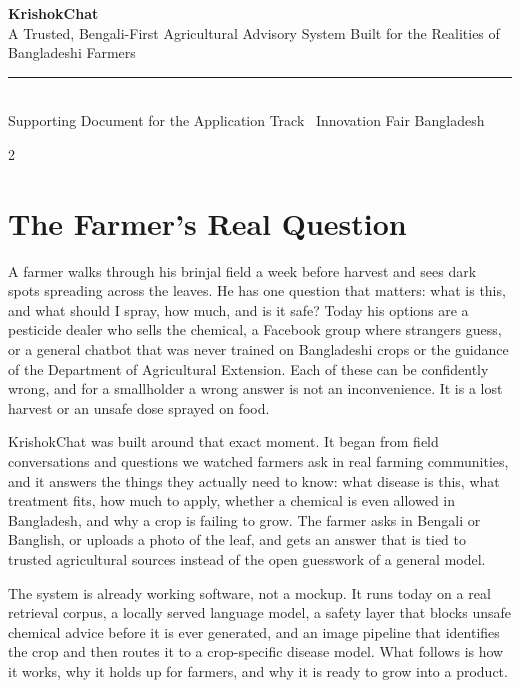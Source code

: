 \documentclass[11pt]{article}
\begin{document}
\begin{center}
{\LARGE\bfseries\color{brandgreen} KrishokChat}\\[3pt]
{\large A Trusted, Bengali-First Agricultural Advisory System Built for the Realities of Bangladeshi Farmers}\\[6pt]
{\color{linegray}\rule{0.9\textwidth}{0.6pt}}\\[4pt]
{\small Supporting Document for the Application Track \textbullet\ Innovation Fair Bangladesh}
\end{center}

\vspace{4pt}

\begin{multicols}{2}

\section{The Farmer's Real Question}

A farmer walks through his brinjal field a week before harvest and sees dark spots spreading across the leaves. He has one question that matters: what is this, and what should I spray, how much, and is it safe? Today his options are a pesticide dealer who sells the chemical, a Facebook group where strangers guess, or a general chatbot that was never trained on Bangladeshi crops or the guidance of the Department of Agricultural Extension. Each of these can be confidently wrong, and for a smallholder a wrong answer is not an inconvenience. It is a lost harvest or an unsafe dose sprayed on food.

KrishokChat was built around that exact moment. It began from field conversations and questions we watched farmers ask in real farming communities, and it answers the things they actually need to know: what disease is this, what treatment fits, how much to apply, whether a chemical is even allowed in Bangladesh, and why a crop is failing to grow. The farmer asks in Bengali or Banglish, or uploads a photo of the leaf, and gets an answer that is tied to trusted agricultural sources instead of the open guesswork of a general model.

The system is already working software, not a mockup. It runs today on a real retrieval corpus, a locally served language model, a safety layer that blocks unsafe chemical advice before it is ever generated, and an image pipeline that identifies the crop and then routes it to a crop-specific disease model. What follows is how it works, why it holds up for farmers, and why it is ready to grow into a product.


\end{multicols}
\end{document}
